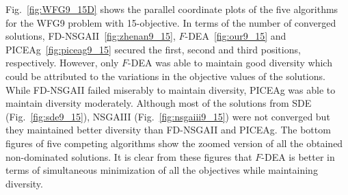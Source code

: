 \documentclass[review]{elsarticle}
\begin{document}
%
Fig.~\ref{fig:WFG9_15D} shows the parallel  
coordinate plots of the five algorithms for the WFG9 problem with 15-objective. 
In terms of the number of converged solutions, FD-NSGAII~\ref{fig:zhenan9_15}, $F$-DEA~\ref{fig:our9_15} and PICEAg~\ref{fig:piceag9_15} secured the first, 
second and third positions, respectively. However, only $F$-DEA was able to maintain good diversity 
which could be attributed to the variations in  the objective values of the solutions. While FD-NSGAII failed miserably to maintain diversity, PICEAg was able to maintain diversity moderately. 
Although most of the solutions from SDE (Fig.~\ref{fig:sde9_15}), NSGAIII (Fig.~\ref{fig:nsgaiii9_15}) were not converged but they maintained better diversity  than FD-NSGAII and PICEAg.
The bottom figures of five competing algorithms show the zoomed version of all the obtained non-dominated solutions. It is clear from these figures that $F$-DEA is better in terms of simultaneous minimization of all the objectives  while maintaining diversity. 
\end{document}
